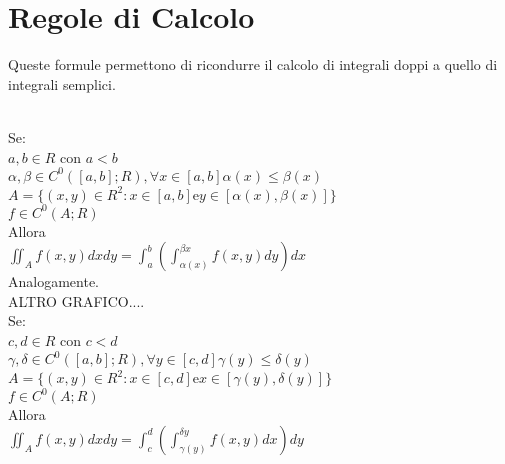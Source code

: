 \section{Regole di Calcolo}
Queste formule permettono di ricondurre il calcolo di integrali doppi a quello di integrali semplici.\\
\\
Se:\\
$a,b\in R$ con $a<b$\\
$\alpha,\beta\in C^0([a,b];R), \forall x\in[a,b] \alpha(x)\le\beta(x)$\\
$A=\{(x,y)\in R^2: x\in [a,b] $e$ y\in [\alpha(x),\beta(x)] \}$\\
$f\in C^0(A;R)$\\
Allora\\
$\iint_Af(x,y)dxdy=\int_a^b\left(\int_{\alpha(x)}^{\beta{x}}f(x,y)dy\right)dx$\\
Analogamente.\\
ALTRO GRAFICO....\\
Se:\\
$c,d\in R$ con $c<d$\\
$\gamma,\delta\in C^0([a,b];R), \forall y\in[c,d] \gamma(y)\le\delta(y)$\\
$A=\{(x,y)\in R^2: x\in [c,d] $e$ x\in [\gamma(y),\delta(y)] \}$\\
$f\in C^0(A;R)$\\
Allora\\
$\iint_Af(x,y)dxdy=\int_c^d\left(\int_{\gamma(y)}^{\delta{y}}f(x,y)dx\right)dy$
